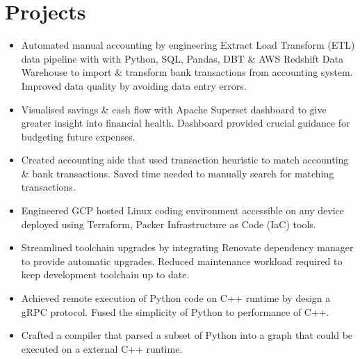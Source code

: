 \section{Projects}
\begin{itemize}
  \item Automated manual accounting by engineering Extract Load Transform (ETL) data pipeline with with Python, SQL, Pandas, DBT \& AWS Redshift Data Warehouse to import \& transform bank transactions from accounting system. Improved data quality by avoiding data entry errors.
  \item Visualised savings \& cash flow with Apache Superset dashboard to give greater insight into financial health. Dashboard provided crucial guidance for budgeting future expenses.
  \item Created accounting aide that used transaction heuristic to match accounting \& bank transactions. Saved time needed to manually search for matching transactions.
\end{itemize}
\begin{itemize}
  \item Engineered GCP hosted Linux coding environment accessible on any device deployed using Terraform,
    Packer Infrastructure as Code (IaC) tools.
  \item Streamlined toolchain upgrades by integrating Renovate dependency manager to provide automatic upgrades. Reduced maintenance workload required to keep development toolchain up to date.
\end{itemize}
\begin{itemize}
\item Achieved remote execution of Python code on C++ runtime by design a gRPC protocol. Fused the simplicity of Python to performance of C++.
\item Crafted a compiler that parsed a subset of Python into a graph that could be executed on a external C++ runtime.
\end{itemize}

